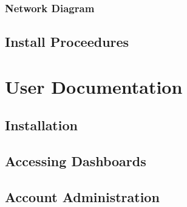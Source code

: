 \documentclass[
    a4paper,
    12pt,
    headings=normal
]{scrreprt}
\begin{document}
            \subsubsection{Network Diagram}

        \newpage
        \subsection{Install Proceedures}
    
    \newpage
    \section{User Documentation}
        \subsection{Installation}
        \subsection{Accessing Dashboards}
        \subsection{Account Administration}

    \newpage
    \printbibliography

    
\end{document}
